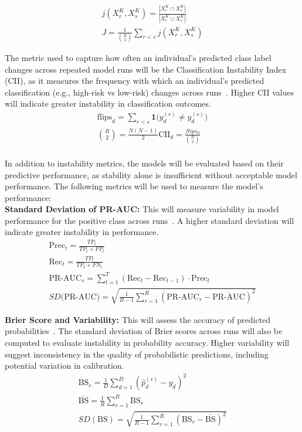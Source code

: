\documentclass{article}
\begin{document}
\begin{align}
  j(X_r^K,X_s^K)=\frac{|X_r^K \cap X_s^K|}{|X_r^K \cup X_s^K|} \\
  J=\frac{1}{\binom{R}{2}}\sum_{r<s}j(X_r^K,X_s^K)
\end{align}

The metric used to capture how often an individual's predicted class label changes across repeated model runs will be the Classification Instability Index (CII), as it measures the frequency with which an individual's predicted classification (e.g., high-risk vs low-risk) changes across runs~\cite{riley2023stability}. Higher CII values will indicate greater instability in classification outcomes.\\

\begin{align}
  \text{flips}_d = \sum_{r<s} \mathbf{1}\big(y_d^{(r)} \ne y_d^{(s)}\big) \\
  \binom{R}{2}=\frac{N(N-1)}{2}
  \text{CII}_d=\frac{flips_d}{\binom{R}{2}} \\
\end{align}

In addition to instability metrics, the models will be evaluated based on their predictive performance, as stability alone is insufficient without acceptable model performance. The following metrics will be used to measure the model's performance: \\
\textbf{Standard Deviation of PR-AUC:} This will measure variability in model performance for the positive class across runs~\cite{lopez2022instability}. A higher standard deviation will indicate greater instability in performance.
\begin{align}
  \text{Prec}_t=\frac{TP_t}{TP_t+FP_t} \\
  \text{Rec}_t=\frac{TP_t}{TP_t+FN_t} \\
  \text{PR-AUC}_r=\sum_{t=1}^{T}(\text{Rec}_t-\text{Rec}_{t-1})\cdot\text{Prec}_t \\
  SD\text{(PR-AUC)}=\sqrt{\frac{1}{R-1}\sum_{r=1}^{R}(\text{PR-AUC}_r-\overline{\text{PR-AUC}})^2}
\end{align}

\textbf{Brier Score and Variability:} This will assess the accuracy of predicted probabilities~\cite{rufibach2010use}. The standard deviation of Brier scores across runs will also be computed to evaluate instability in probability accuracy. Higher variability will suggest inconsistency in the quality of probabilistic predictions, including potential variation in calibration.
\begin{align}
  \text{BS}_r = \frac{1}{D} \sum_{d=1}^{D} \left( \hat{p}_d^{(r)} - y_d \right)^2 \\
  \overline{\text{BS}}=\frac{1}{R}\sum_{r=1}^{R}\text{BS}_r \\
  SD(\text{BS}) = \sqrt{ \frac{1}{R - 1} \sum_{r=1}^{R} \left( \text{BS}_r - \overline{\text{BS}} \right)^2 }
\end{align}
\end{document}
